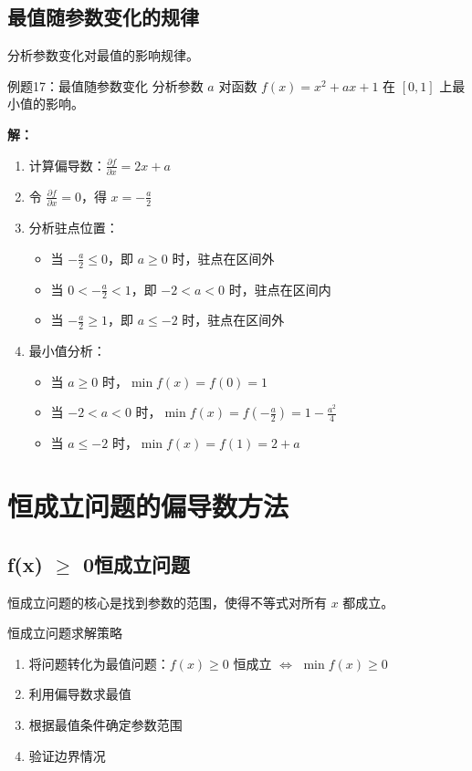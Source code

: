 \documentclass[a4paper,11pt]{ctexart}
\newcommand{\partialder}[2]{\frac{\partial #1}{\partial #2}}
\theoremstyle{definition}
\theoremstyle{remark}
\begin{document}
\subsection{最值随参数变化的规律}

分析参数变化对最值的影响规律。

\begin{examplebox}{例题17：最值随参数变化}
分析参数 $a$ 对函数 $f(x) = x^2 + ax + 1$ 在 $[0,1]$ 上最小值的影响。

\textbf{解：}
\begin{enumerate}
    \item 计算偏导数：$\partialder{f}{x} = 2x + a$
    \item 令 $\partialder{f}{x} = 0$，得 $x = -\frac{a}{2}$
    \item 分析驻点位置：
    \begin{itemize}
        \item 当 $-\frac{a}{2} \leq 0$，即 $a \geq 0$ 时，驻点在区间外
        \item 当 $0 < -\frac{a}{2} < 1$，即 $-2 < a < 0$ 时，驻点在区间内
        \item 当 $-\frac{a}{2} \geq 1$，即 $a \leq -2$ 时，驻点在区间外
    \end{itemize}
    \item 最小值分析：
    \begin{itemize}
        \item 当 $a \geq 0$ 时，$\min f(x) = f(0) = 1$
        \item 当 $-2 < a < 0$ 时，$\min f(x) = f(-\frac{a}{2}) = 1 - \frac{a^2}{4}$
        \item 当 $a \leq -2$ 时，$\min f(x) = f(1) = 2 + a$
    \end{itemize}
\end{enumerate}
\end{examplebox}

\section{恒成立问题的偏导数方法}

\subsection{f(x) \texorpdfstring{$\geq$}{>=} 0恒成立问题}

恒成立问题的核心是找到参数的范围，使得不等式对所有 $x$ 都成立。

\begin{methodbox}{恒成立问题求解策略}
\begin{enumerate}
    \item 将问题转化为最值问题：$f(x) \geq 0$ 恒成立 $\Leftrightarrow$ $\min f(x) \geq 0$
    \item 利用偏导数求最值
    \item 根据最值条件确定参数范围
    \item 验证边界情况
\end{enumerate}
\end{methodbox}
\end{document}

